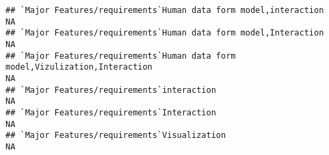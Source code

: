 \documentclass[]{article}
\begin{document}
\begin{verbatim}
## `Major Features/requirements`Human data form model,interaction                                                                                                                                                                                                                                                                                                                                                                                                                        NA
## `Major Features/requirements`Human data form model,Interaction                                                                                                                                                                                                                                                                                                                                                                                                                        NA
## `Major Features/requirements`Human data form model,Vizulization,Interaction                                                                                                                                                                                                                                                                                                                                                                                                           NA
## `Major Features/requirements`interaction                                                                                                                                                                                                                                                                                                                                                                                                                                              NA
## `Major Features/requirements`Interaction                                                                                                                                                                                                                                                                                                                                                                                                                                              NA
## `Major Features/requirements`Visualization                                                                                                                                                                                                                                                                                                                                                                                                                                            NA

\end{verbatim}
\end{document}
